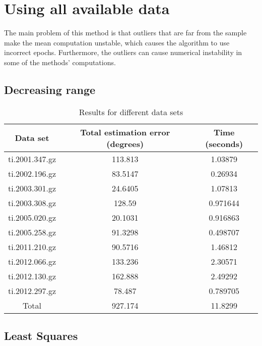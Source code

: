 \section{Using all available data}

The main problem of this method is that outliers that are far from the sample make the mean computation unstable, which causes the algorithm to use incorrect epochs. Furthermore, the outliers can cause numerical instability in some of the methods' computations.

\subsection{Decreasing range}

\begin{table}[h!]
	\centering
	\def\arraystretch{1.2}
	\begin{tabular}{|c c c|} 
		\hline
		Data set & Total estimation error (degrees) & Time (seconds) \\ [0.5ex] 
		\hline\hline
		ti.2001.347.gz & 113.813 & 1.03879 \\
		\hline
		ti.2002.196.gz & 83.5147 & 0.26934 \\
		\hline
		ti.2003.301.gz & 24.6405 & 1.07813 \\
		\hline
		ti.2003.308.gz & 128.59 & 0.971644 \\
		\hline
		ti.2005.020.gz & 20.1031 & 0.916863 \\
		\hline
		ti.2005.258.gz & 91.3298 & 0.498707 \\
		\hline
		ti.2011.210.gz & 90.5716 & 1.46812 \\
		\hline
		ti.2012.066.gz & 133.236 & 2.30571 \\
		\hline
		ti.2012.130.gz & 162.888 & 2.49292 \\
		\hline
		ti.2012.297.gz & 78.487 & 0.789705 \\
		\hline\hline
		Total & 927.174 & 11.8299 \\
		\hline
	\end{tabular}
	\caption{Results for different data sets}
\end{table}

\subsection{Least Squares}

